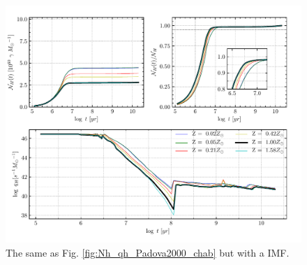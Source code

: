 \documentclass[12pt,letterpaper,usenatbib,useAMS]{article}
\begin{document}
\begin{figure}
    \includegraphics[width=\textwidth]{figs/Nh_logt_metBase_Padova2000_salp.pdf}
    \caption{The same as Fig. \ref{fig:Nh_qh_Padova2000_chab} but with a \citet{Salpeter.1955a} IMF.}
    \label{fig:Nh_qh_Padova2000_salp}
\end{figure}
\end{document}
